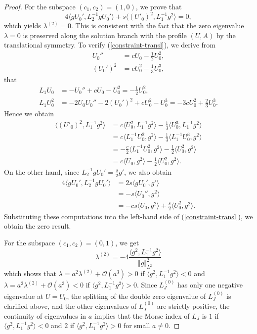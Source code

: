 \documentclass[12pt,reqno]{amsart}
\numberwithin{equation}{section}
\begin{document}
\begin{proof}
For the subspace $(c_1,c_2) = (1,0)$, we prove that 
\begin{equation}
    \label{constraint-transl}
4 \langle g U_0', L_2^{-1} g U_0' \rangle + s \langle (U'_0)^2, L_{1}^{-1}g^2 \rangle = 0,
\end{equation}
which yields $\lambda^{(2)} = 0$. This is consistent with the fact that the zero eigenvalue $\lambda = 0$ is 
preserved along the solution branch with the profile $(U,A)$ by the translational symmetry. To verify (\ref{constraint-transl}), we derive from 
\begin{align*}
    U_0'' &= c U_0 - \frac{1}{2} U_0^2, \\
    (U_0')^2 &= c U_0^2 - \frac{1}{3} U_0^3,
\end{align*}
that 
\begin{align*}
    L_1 U_0 &= -U_0'' + c U_0 - U_0^2 = -\frac{1}{2} U_0^2, \\
    L_1 U_0^2 &= -2 U_0 U_0'' - 2 (U_0')^2 + c U_0^2 - U_0^3 = -3 c U_0^2 + \frac{2}{3} U_0^3.
\end{align*}
Hence we obtain 
\begin{align*}
\langle (U'_0)^2, L_{1}^{-1}g^2 \rangle &= c \langle U_0^2, L_{1}^{-1}g^2 \rangle - \frac{1}{3} \langle U_0^3, L_{1}^{-1}g^2 \rangle\\
 &= c \langle L_{1}^{-1} U_0^2, g^2 \rangle - \frac{1}{3} \langle L_{1}^{-1} U_0^3, g^2 \rangle\\
  &= -\frac{c}{2} \langle L_{1}^{-1} U_0^2, g^2 \rangle - \frac{1}{2} \langle U_0^2, g^2 \rangle\\
    &= c \langle U_0, g^2 \rangle - \frac{1}{2} \langle U_0^2, g^2 \rangle.
\end{align*}
On the other hand, since $L_2^{-1} g U_0' = \frac{s}{2} g'$, we also obtain 
\begin{align*}
4 \langle g U_0', L_2^{-1} g U_0' \rangle &= 2 s \langle g U_0', g' \rangle \\
 &= - s \langle U_0'', g^2 \rangle \\
  &= -c s  \langle U_0, g^2 \rangle + \frac{s}{2} \langle U_0^2, g^2 \rangle.
\end{align*}
Substituting these computations into the left-hand side of (\ref{constraint-transl}), we obtain the zero result.

For the subspace $(c_1,c_2) = (0,1)$, we get 
\[
\lambda^{(2)}=-4\frac{\langle g^2,L_{1}^{-1}g^2\rangle}{\Vert g\Vert^2_{L^2}}
\]
which shows that $\lambda = a^2 \lambda^{(2)} + \mathcal{O}(a^3) > 0$ if $\langle g^2,L_{1}^{-1}g^2\rangle < 0$ and $\lambda = a^2 \lambda^{(2)} + \mathcal{O}(a^3) < 0$ if $\langle g^2,L_{1}^{-1}g^2\rangle > 0$. Since $L_J^{(0)}$ has only one negative eigenvalue at $U = U_0$, the splitting of the double zero eigenvalue 
of $L_J^{(0)}$ is clarified above, and the other eigenvalues of $L_J^{(0)}$ are strictly positive, the continuity of eigenvalues in $a$ implies that the Morse index of $L_J$ is $1$ if $\langle g^2,L_{1}^{-1}g^2\rangle < 0$ and $2$ if $\langle g^2,L_{1}^{-1}g^2\rangle > 0$ for small $a \neq 0$. 


\end{proof}
\end{document}
